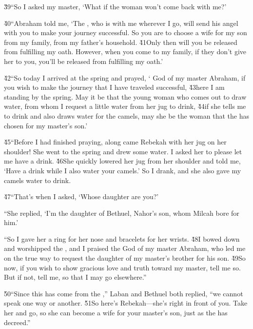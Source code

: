 \v{39}``So I asked my master, `What if the woman won't come back with me?'

\v{40}``Abraham told me, `The , who is with me wherever I go, will send his angel with you to make your journey successful. So you are to choose a wife for my son from my family, from my father's household. \v{41}Only then will you be released from fulfilling my oath. However, when you come to my family, if they don't give her to you, you'll be released from fulfilling my oath.'

\v{42}``So today I arrived at the spring and prayed, ` God of my master Abraham, if you wish to make the journey that I have traveled successful, \v{43}here I am standing by the spring. May it be that the young woman who comes out to draw water, from whom I request a little water from her jug to drink, \v{44}if she tells me to drink and also draws water for the camels, may she be the woman that the  has chosen for my master's son.'

\v{45}``Before I had finished praying, along came Rebekah with her jug on her shoulder! She went to the spring and drew some water. I asked her to please let me have a drink. \v{46}She quickly lowered her jug from her shoulder and told me, `Have a drink while I also water your camels.' So I drank, and she also gave my camels water to drink.

\v{47}``That's when I asked, `Whose daughter are you?'

``She replied, `I'm the daughter of Bethuel, Nahor's son, whom Milcah bore for him.'

``So I gave her a ring for her nose and bracelets for her wrists. \v{48}I bowed down and worshipped the , and I praised the  God of my master Abraham, who led me on the true way to request the daughter of my master's brother for his son. \v{49}So now, if you wish to show gracious love and truth toward my master, tell me so. But if not, tell me, so that I may go elsewhere.''

\v{50}``Since this has come from the ,'' Laban and Bethuel both replied, ``we cannot speak one way or another. \v{51}So here's Rebekah---she's right in front of you. Take her and go, so she can become a wife for your master's son, just as the  has decreed.''

